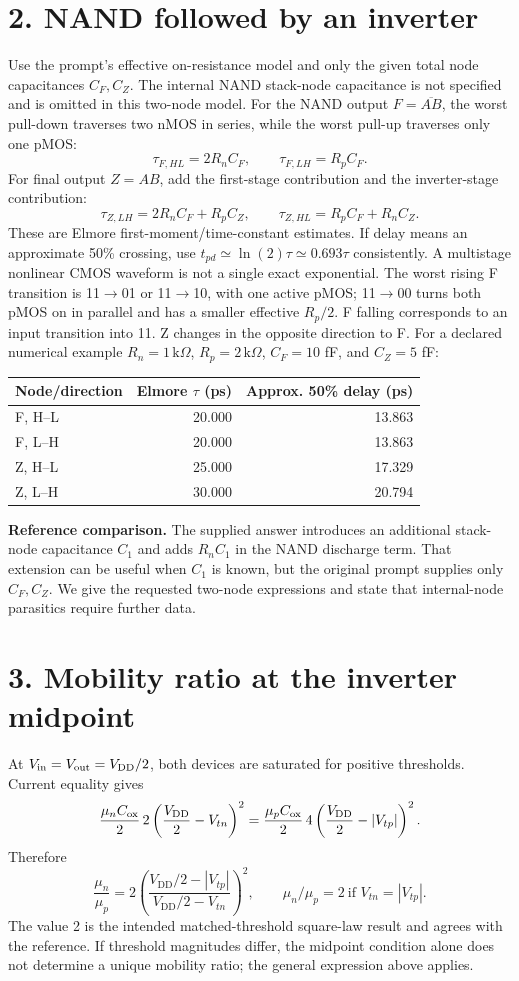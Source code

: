 \documentclass[11pt,a4paper]{article}
\newcommand{\VDD}{V_{\mathrm{DD}}}
\begin{document}
\section*{2. NAND followed by an inverter}
Use the prompt's effective on-resistance model and only the given total node capacitances $C_F,C_Z$. The internal NAND stack-node capacitance is not specified and is omitted in this two-node model. For the NAND output $F=\overline{AB}$, the worst pull-down traverses two nMOS in series, while the worst pull-up traverses only one pMOS:
\[
 \boxed{\tau_{F,HL}=2R_nC_F},\qquad
 \boxed{\tau_{F,LH}=R_pC_F}.
\]
For final output $Z=AB$, add the first-stage contribution and the inverter-stage contribution:
\[
 \boxed{\tau_{Z,LH}=2R_nC_F+R_pC_Z},\qquad
 \boxed{\tau_{Z,HL}=R_pC_F+R_nC_Z}.
\]
These are Elmore first-moment/time-constant estimates. If delay means an approximate 50\% crossing, use $t_{pd}\simeq\ln(2)\tau\simeq 0.693\tau$ consistently. A multistage nonlinear CMOS waveform is not a single exact exponential.
\newpage
The worst rising F transition is 11$\to$01 or 11$\to$10, with one active pMOS; 11$\to$00 turns both pMOS on in parallel and has a smaller effective $R_p/2$. F falling corresponds to an input transition into 11. Z changes in the opposite direction to F.
For a declared numerical example $R_n=1\,\mathrm{k}\Omega$, $R_p=2\,\mathrm{k}\Omega$, $C_F=10$ fF, and $C_Z=5$ fF:
\begin{center}\begin{tabular}{lrr}\toprule
Node/direction&Elmore $\tau$ (ps)&Approx. 50\% delay (ps)\\\midrule
F, H--L&20.000&13.863\\F, L--H&20.000&13.863\\
Z, H--L&25.000&17.329\\Z, L--H&30.000&20.794\\\bottomrule
\end{tabular}\end{center}
\textbf{Reference comparison.} The supplied answer introduces an additional stack-node capacitance $C_1$ and adds $R_nC_1$ in the NAND discharge term. That extension can be useful when $C_1$ is known, but the original prompt supplies only $C_F,C_Z$. We give the requested two-node expressions and state that internal-node parasitics require further data.
\section*{3. Mobility ratio at the inverter midpoint}
At $V_{\rm in}=V_{\rm out}=\VDD/2$, both devices are saturated for positive thresholds. Current equality gives
\[
 \frac{\mu_n C_{\rm ox}}2\,2\left(\frac{\VDD}2-V_{tn}\right)^2
 =\frac{\mu_p C_{\rm ox}}2\,4\left(\frac{\VDD}2-|V_{tp}|\right)^2.
\]
Therefore
\[
 \frac{\mu_n}{\mu_p}
 =2\left(\frac{\VDD/2-|V_{tp}|}{\VDD/2-V_{tn}}\right)^2,
 \qquad \boxed{\mu_n/\mu_p=2\ \text{if }V_{tn}=|V_{tp}|.}
\]
The value 2 is the intended matched-threshold square-law result and agrees with the reference. If threshold magnitudes differ, the midpoint condition alone does not determine a unique mobility ratio; the general expression above applies.
\end{document}
